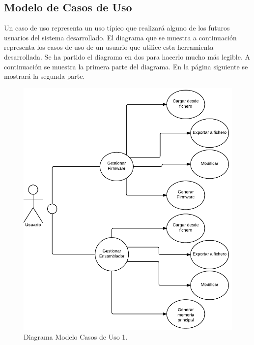 \fi

\clearpage
\subsection{Modelo de Casos de Uso}
\label{sec:user_cases}

Un caso de uso representa un uso típico que realizará alguno de los futuros usuarios del sistema desarrollado. El diagrama que se muestra a continuación representa los casos de uso de un usuario que utilice esta herramienta desarrollada. Se ha partido el diagrama en dos para hacerlo mucho más legible. A continuación se muestra la primera parte del diagrama. En la página siguiente se mostrará la segunda parte.

\begin{figure}[htbp]
 	\centering
 	\includegraphics[width=14cm]{figures/user_cases_1}
 	\caption{Diagrama Modelo Casos de Uso 1.}
	\label{fig:user_cases1}
\end{figure}

\vspace{20 mm}

